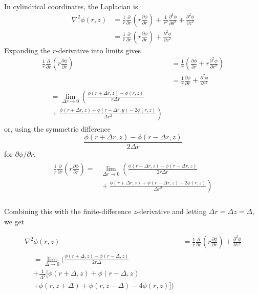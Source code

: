 \documentclass[twocolumn,aps,prl]{revtex4-1} %
\newcommand{\pdd}[2]{\frac{\partial #1}{\partial #2}}
\newcommand{\pd}[1]{\frac{\partial}{\partial #1}}
\newcommand{\psdd}[2]{\frac{{\partial}^2 #1}{\partial {#2}^2}}
\begin{document}
In cylindrical coordinates, the Laplacian is \cite{arfken_mathematical_2013}
\begin{align*}
	\nabla^2 \phi(r,z) &= \frac{1}{r} \pd{r} \left(r \pdd{\phi}{r}\right) + \frac{1}{r^2} \psdd{\phi}{\theta} + \psdd{\phi}{z} \\
	&=  \frac{1}{r} \pd{r} \left( r \pdd{\phi}{r}\right) +  \psdd{\phi}{z} 
\end{align*}
Expanding the $r$-derivative into limits gives
\begin{align*}
\frac{1}{r} \pd{r} \left( r \pdd{\phi}{r}\right) &={} \frac{1}{r} \left( \pdd{\phi}{r} +r \psdd{\phi}{r} \right) \\
&={} \frac{1}{r} \pdd{\phi}{r} + \psdd{\phi}{r} \\	
\begin{split}
&={} \lim_{\Delta r \to 0} \left(  \frac{\phi(r + \Delta r, z) - \phi(r,z)}{r \Delta r} \right. \\
         &{} \left. {}+ \frac{\phi(r + \Delta r, z) + \phi(r-\Delta r, y) - 2\phi(r,z)}{\Delta r^2} \right)
\end{split}
\end{align*}
or, using the symmetric difference $$\frac{\phi(r+\Delta r, z) - \phi(r - \Delta r, z)}{2 \Delta r}$$ for $\partial \phi / \partial r$,
\begin{align*}
\begin{split}
    \frac{1}{r} \pd{r} \left( r \pdd{\phi}{r}\right) ={}& \lim_{\Delta r \to 0} \left(  \frac{\phi(r + \Delta r, z) - \phi(r - \Delta r,z)}{2 r \Delta r} \right. \\
         &\left. {}+ \frac{\phi(r + \Delta r, z) + \phi(r-\Delta r, z) - 2\phi(r,z)}{\Delta r^2} \right) \\
\end{split}
\end{align*}

Combining this with the finite-difference $z$-derivative and letting $\Delta r = \Delta z = \Delta$, we get

\begin{align*}
\nabla^2 \phi(r,z) &={} \frac{1}{r} \pd{r} \left(r \pdd{\phi}{r}\right) + \psdd{\phi}{z} \\
\begin{split}
&={} \lim_{\Delta \to 0} \bigg(  \frac{\phi(r + \Delta, z) - \phi(r - \Delta,z)}{2 r \Delta} \\
&+\frac{1}{\Delta^2}\big[\phi(r + \Delta, z) + \phi(r-\Delta, z) \\
&+ \phi(r, z + \Delta) + \phi(r, z - \Delta) - 4\phi(r,z)\big] \bigg) \\
\end{split}\\
\end{align*}
\end{document}
